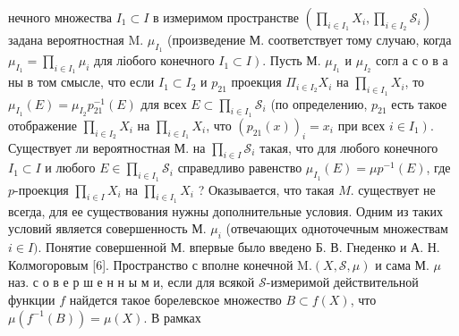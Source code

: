 \documentclass[10pt]{article}
\begin{document}
нечного множества $I_{1} \subset I$ в измеримом пространстве $\left(\prod_{i \in I_{1}} X_{i}, \prod_{i \in I_{2}} \mathscr{S}_{i}\right)$ задана вероятностная M. $\mu_{I_{1}}$ (произведение М. соответствует тому случаю, когда $\mu_{I_{1}}=\prod_{i \in I_{1}} \mu_{i}$ для ліобого конечного $\left.I_{1} \subset I\right)$. Пусть М. $\mu_{I_{1}}$ и $\mu_{I_{2}}$ согл а с о в а ны в том смысле, что если $I_{1} \subset I_{2}$ и $p_{21}$ проекция $\Pi_{i \in I_{2}} X_{i}$ на $\prod_{i \in I_{1}} X_{i}$, то $\mu_{I_{1}}(E)=\mu_{I_{2}} p_{21}^{-1}(E)$ для всех $E \subset \prod_{i \in I_{1}} \mathscr{S}_{i}$ (по определению, $p_{21}$ есть такое отображение $\prod_{i \in I_{2}} X_{i}$ на $\prod_{i \in I_{1}} X_{i}$, что $\left(p_{21}(x)\right)_{i}=x_{i}$ при всех $\left.i \in I_{1}\right)$. Существует ли вероятностная М. на $\prod_{i \in I} \mathscr{S}_{i}$ такая, что для любого конечного $I_{1} \subset I$ и любого $E \in \prod_{i \in I_{1}} \mathscr{S}_{i}$ справедливо равенство $\mu_{I_{1}}(E)=\mu p^{-1}(E)$, где $p$-проекция $\prod_{i \in I} X_{i}$ на $\prod_{i \in I_{1}} X_{i}$ ? Оказывается, что такая $M$. существует не всегда, для ее существования нужны дополнительные условия. Одним из таких условий является совершенность М. $\mu_{i}$ (отвечающих одноточечным множествам $i \in I)$. Понятие совершенной М. впервые было введено Б. В. Гнеденко и А. Н. Колмогоровым [6]. Пространство с вполне конечной $\mathrm{M} .(X, \mathscr{\mathscr { S }}, \mu)$ и сама М. $\mu$ наз. с о в е р ш е н н ы м и, если для всякой $\mathscr{S}$-измеримой действительной функции $f$ найдется такое борелевское множество $B \subset f(X)$, что $\mu\left(f^{-1}(B)\right)=\mu(X)$. В рамках
\end{document}
